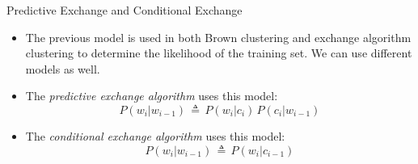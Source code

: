 \documentclass[xcolor=pdftex,x11names,table,hyperref]{beamer}
\begin{document}
\begin{frame}{Predictive Exchange and Conditional Exchange}
\begin{itemize}
	\item The previous model is used in both Brown clustering and exchange algorithm clustering to determine the likelihood of the training set.
	We can use different models as well.
	\pause
	\item The \emph{predictive exchange algorithm} uses this model:
	\begin{equation*}
		P(w_i|w_{i-1}) \,\triangleq\, P(w_i | c_i) \, P(c_i | w_{i-1})
	\end{equation*}
	\item The \emph{conditional exchange algorithm} uses this model:
	\begin{equation*}
		P(w_i|w_{i-1}) \,\triangleq\, P(w_i | c_{i-1})
	\end{equation*}
\end{itemize}
\end{frame}
\end{document}
